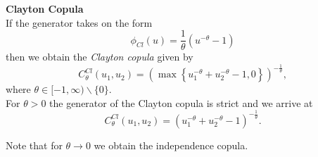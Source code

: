 \textbf{Clayton Copula}\\
If the generator takes on the form
\begin{equation}
\phi_{C l}(u)=\frac{1}{\theta}\left(u^{-\theta}-1\right)
\end{equation}
then we obtain the \textit{Clayton copula} given by
\begin{equation}
C_{\theta}^{C l}\left(u_{1}, u_{2}\right)=\left(\max \left\{u_{1}^{-\theta}+u_{2}^{-\theta}-1,0\right\}\right)^{-\frac{1}{\theta}},
\end{equation}
where $\theta \in[-1, \infty) \backslash\{0\}$.\\
For $\theta > 0$ the generator of the Clayton copula is strict and we arrive at 
\begin{equation}
C_{\theta}^{C l}\left(u_{1}, u_{2}\right)= (u_{1}^{-\theta}+u_{2}^{-\theta}-1)^{-\frac{1}{\theta}}.
\end{equation}

Note that for $\theta \rightarrow 0$ we obtain the independence copula.
\\


